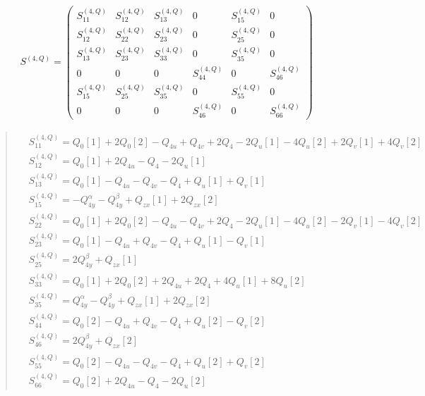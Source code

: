 \documentclass[fleqn,10pt]{jsarticle}
\begin{document}
\begin{align*}
S^{(4,Q)} = \begin{pmatrix} S^{(4,Q)}_{11} & S^{(4,Q)}_{12} & S^{(4,Q)}_{13} & 0 & S^{(4,Q)}_{15} & 0 \\ S^{(4,Q)}_{12} & S^{(4,Q)}_{22} & S^{(4,Q)}_{23} & 0 & S^{(4,Q)}_{25} & 0 \\ S^{(4,Q)}_{13} & S^{(4,Q)}_{23} & S^{(4,Q)}_{33} & 0 & S^{(4,Q)}_{35} & 0 \\ 0 & 0 & 0 & S^{(4,Q)}_{44} & 0 & S^{(4,Q)}_{46} \\ S^{(4,Q)}_{15} & S^{(4,Q)}_{25} & S^{(4,Q)}_{35} & 0 & S^{(4,Q)}_{55} & 0 \\ 0 & 0 & 0 & S^{(4,Q)}_{46} & 0 & S^{(4,Q)}_{66} \end{pmatrix}
\end{align*}
\begin{quote}
\begin{align*}
& S^{(4,Q)}_{11} = Q_{0}[1] + 2 Q_{0}[2] - Q_{4u} + Q_{4v} + 2 Q_{4} - 2 Q_{u}[1] - 4 Q_{u}[2] + 2 Q_{v}[1] + 4 Q_{v}[2] \\
& S^{(4,Q)}_{12} = Q_{0}[1] + 2 Q_{4u} - Q_{4} - 2 Q_{u}[1] \\
& S^{(4,Q)}_{13} = Q_{0}[1] - Q_{4u} - Q_{4v} - Q_{4} + Q_{u}[1] + Q_{v}[1] \\
& S^{(4,Q)}_{15} = - Q_{4y}^{\alpha} - Q_{4y}^{\beta} + Q_{zx}[1] + 2 Q_{zx}[2] \\
& S^{(4,Q)}_{22} = Q_{0}[1] + 2 Q_{0}[2] - Q_{4u} - Q_{4v} + 2 Q_{4} - 2 Q_{u}[1] - 4 Q_{u}[2] - 2 Q_{v}[1] - 4 Q_{v}[2] \\
& S^{(4,Q)}_{23} = Q_{0}[1] - Q_{4u} + Q_{4v} - Q_{4} + Q_{u}[1] - Q_{v}[1] \\
& S^{(4,Q)}_{25} = 2 Q_{4y}^{\beta} + Q_{zx}[1] \\
& S^{(4,Q)}_{33} = Q_{0}[1] + 2 Q_{0}[2] + 2 Q_{4u} + 2 Q_{4} + 4 Q_{u}[1] + 8 Q_{u}[2] \\
& S^{(4,Q)}_{35} = Q_{4y}^{\alpha} - Q_{4y}^{\beta} + Q_{zx}[1] + 2 Q_{zx}[2] \\
& S^{(4,Q)}_{44} = Q_{0}[2] - Q_{4u} + Q_{4v} - Q_{4} + Q_{u}[2] - Q_{v}[2] \\
& S^{(4,Q)}_{46} = 2 Q_{4y}^{\beta} + Q_{zx}[2] \\
& S^{(4,Q)}_{55} = Q_{0}[2] - Q_{4u} - Q_{4v} - Q_{4} + Q_{u}[2] + Q_{v}[2] \\
& S^{(4,Q)}_{66} = Q_{0}[2] + 2 Q_{4u} - Q_{4} - 2 Q_{u}[2]
\end{align*}
\end{quote}
\end{document}
